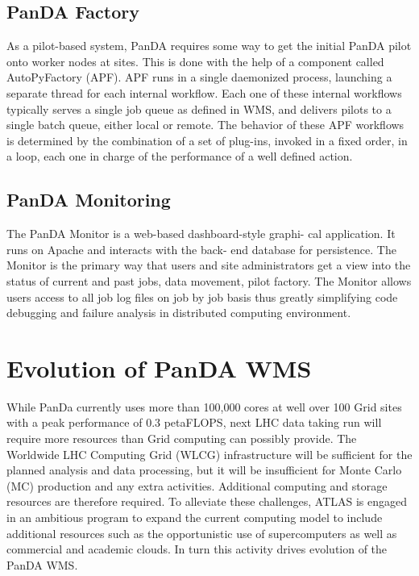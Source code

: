 \documentclass[10pt, conference, compsocconf]{IEEEtran}
\begin{document}
\subsection{PanDA Factory}
As a pilot-based  system, PanDA  requires some way to get the initial PanDA pilot onto worker nodes at sites. This is done with the help of a component  called AutoPyFactory (APF). APF runs in a single daemonized process, launching  a separate thread for each internal  workflow. Each one of these internal workflows typically serves  a single job queue  as defined  in WMS, and delivers pilots to a single batch queue, either local or remote. The behavior of these APF workflows is determined by the combination of a set  of plug-ins, invoked in a  fixed order, in a loop, each one in charge of the performance of a well defined action.

\subsection{PanDA Monitoring}
The PanDA Monitor is a web-based dashboard-style  graphi- cal application. It runs on Apache and interacts with the back- end database for persistence. The Monitor is the primary way that users and site administrators get a  view into the status of current and past jobs, data movement,  pilot factory. The Monitor allows users  access  to all job log files on job by job basis thus greatly simplifying code debugging and failure analysis in distributed computing environment.

\section{Evolution of PanDA WMS}
While PanDa  currently uses  more than 100,000  cores at well over 100 Grid sites with a  peak performance  of 0.3 petaFLOPS,  next LHC data taking run will  require more resources  than Grid computing can possibly provide. The Worldwide LHC Computing Grid (WLCG) infrastructure will be sufficient for the planned analysis and data processing, but it will be insufficient  for Monte Carlo (MC) production and any extra activities. Additional computing and storage  resources are therefore required.  To alleviate  these challenges, ATLAS is engaged  in an ambitious  program to expand  the current computing model to include  additional  resources such as the opportunistic   use of supercomputers   as well as commercial and academic clouds. In turn this activity drives evolution of the PanDA WMS.
\end{document}
